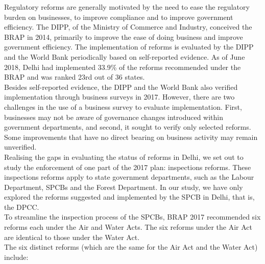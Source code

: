 \documentclass[a4paper, 12pt]{article}
\begin{document}
                 Regulatory reforms are generally motivated by the need to ease the regulatory burden on businesses, to improve compliance and to improve government efficiency. The DIPP, of the Ministry of Commerce and Industry, conceived the BRAP in 2014, primarily to improve the ease of doing business and improve government efficiency. The implementation of reforms is evaluated by the DIPP and the World Bank periodically based on self-reported evidence. As of June 2018, Delhi had implemented 33.9\% of the reforms recommended under the BRAP and was ranked 23rd out of 36 states. \\
                 
                 Besides self-reported evidence, the DIPP and the World Bank also verified implementation through business surveys in 2017. However, there are two challenges in the use of a business survey to evaluate implementation. First, businesses may not be aware of governance changes introduced within government departments, and second, it sought to verify only selected reforms. Some improvements that have no direct bearing on business activity may remain unverified. \\
                 
                 Realising the gaps in evaluating the status of reforms in Delhi, we set out to study the enforcement of one part of the 2017 plan: inspections reforms. These inspections reforms apply to state government departments, such as the Labour Department, SPCBs and the Forest Department. In our study, we have only explored the reforms suggested and implemented by the SPCB in Delhi, that is, the DPCC. \\
                 
                 To streamline the inspection process of the SPCBs, BRAP 2017 recommended six reforms each under the Air and Water Acts. The six reforms under the Air Act are identical to those under the Water Act. \\
                 
                 The six distinct reforms (which are the same for the Air Act and the Water Act) include: \\
                 
\end{document}
